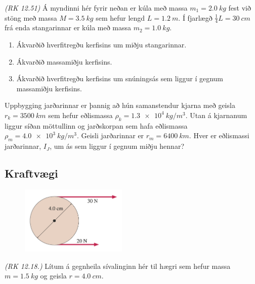 \begin{enumerate}[label = \textbf{Dæmi \thechapter.\arabic*.}]
\begin{minipage}{\linewidth}
\item \textit{(RK 12.51)} Á myndinni hér fyrir neðan er kúla með massa $m_1 = \SI{2.0}{kg}$ fest við stöng með massa $M = \SI{3.5}{kg}$ sem hefur lengd $L = \SI{1.2}{m}$. Í fjarlægð $\frac{1}{4}L = \SI{30}{cm}$ frá enda stangarinnar er kúla með massa $m_2 = \SI{1.0}{kg}$.

\begin{enumerate}[label = \textbf{(\alph*)}]
    \item Ákvarðið hverfitregðu kerfisins um miðju stangarinnar.
    \item Ákvarðið massamiðju kerfisins.
    \item Ákvarðið hverfitregðu kerfisins um snúningsás sem liggur í gegnum massamiðju kerfisins.
\end{enumerate}

\end{minipage}

\item Uppbygging jarðarinnar er þannig að hún samanstendur kjarna með geisla $r_k = \SI{3500}{km}$ sem hefur eðlismassa $\rho_k = \SI{1.3e4}{kg/m^3}$. Utan á kjarnanum liggur síðan möttullinn og jarðskorpan sem hafa eðlismassa $\rho_m = \SI{4.0e3}{kg/m^3}$. Geisli jarðarinnar er $r_m = \SI{6400}{km}$. Hver er eðlismassi jarðarinnar, $I_J$, um ás sem liggur í gegnum miðju hennar?





\subsection*{Kraftvægi}

\begin{minipage}{\linewidth}

\begin{figure}
\vspace{-0.755cm}
\includegraphics[width=2in]{images/torque1.png}
\end{figure}

\item \textit{(RK 12.18.)} Lítum á gegnheila sívalinginn hér til hægri sem hefur massa $m = \SI{1.5}{kg}$ og geisla $r = \SI{4.0}{cm}$.


\end{minipage}
\end{enumerate}
